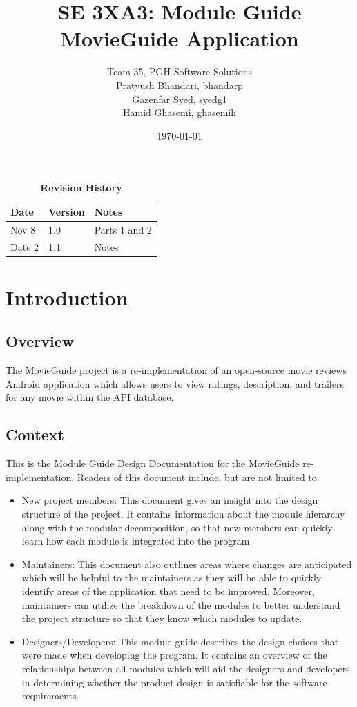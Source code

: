 \documentclass[12pt, titlepage]{article}
\title{SE 3XA3: Module Guide\\MovieGuide Application}
\author{Team 35, PGH Software Solutions
		\\ Pratyush Bhandari, bhandarp
		\\ Gazenfar Syed, syedg1
		\\ Hamid Ghasemi, ghasemih
}
\date{\today}
\begin{document}
\maketitle

\tableofcontents

\newpage

\listoftables
\listoffigures

\begin{table}[bp]
\caption{\bf Revision History}
\begin{tabularx}{\textwidth}{p{3cm}p{2cm}X}
\toprule {\bf Date} & {\bf Version} & {\bf Notes}\\
\midrule
Nov 8 & 1.0 & Parts 1 and 2\\
Date 2 & 1.1 & Notes\\
\bottomrule
\end{tabularx}
\end{table}


 
\newpage
\section{Introduction}

\subsection{Overview}
The MovieGuide project is a re-implementation of an open-source movie reviews Android application which allows users to view ratings, description, and trailers for any movie within the API database.

\subsection{Context}
This is the Module Guide Design Documentation for the MovieGuide re-implementation. Readers of this document include, but are not limited to:

\begin{itemize}
	\item New project members: This document gives an insight into the design structure of the project. It contains information about the module hierarchy along with the modular decomposition, so that new members can quickly learn how each module is integrated into the program.
	\item Maintainers: This document also outlines areas where changes are anticipated which will be helpful to the maintainers as they will be able to quickly identify areas of the application that need to be improved. Moreover, maintainers can utilize the breakdown of the modules to better understand the project structure so that they know which modules to update.
	\item Designers/Developers: This module guide describes the design choices that were made when developing the program. It contains an overview of the relationships between all modules which will aid the designers and developers in determining whether the product design is satisfiable for the software requirements.
\end{itemize}
\end{document}
